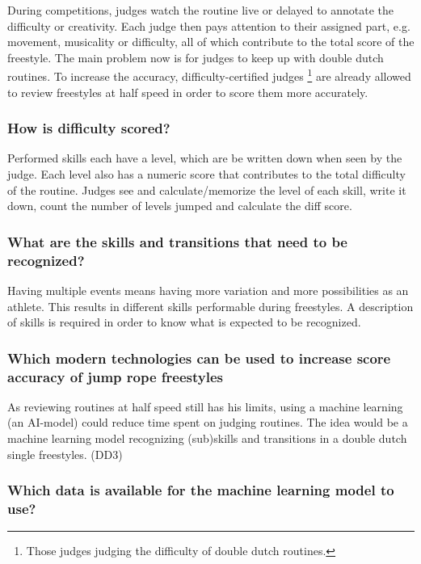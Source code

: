 During competitions, judges watch the routine live or delayed to annotate the difficulty or creativity. Each judge then pays attention to their assigned part, e.g. movement, musicality or difficulty, all of which contribute to the total score of the freestyle. The main problem now is for judges to keep up with double dutch routines. To increase the accuracy, difficulty-certified judges \footnote{Those judges judging the difficulty of double dutch routines.} are already allowed to review freestyles at half speed in order to score them more accurately.

\subsubsection{How is difficulty scored?}
\label{intro-bp:question-difficulty-scored}

Performed skills each have a level, which are be written down when seen by the judge. Each level also has a numeric score that contributes to the total difficulty of the routine. Judges see and calculate/memorize the level of each skill, write it down, count the number of levels jumped and calculate the diff score.

\subsubsection{What are the skills and transitions that need to be recognized?}
\label{intro-bp:question-what-are-the-skills-to-be-recognized}

Having multiple events means having more variation and more possibilities as an athlete. This results in different skills performable during freestyles. A description of skills is required in order to know what is expected to be recognized.

\subsubsection{Which modern technologies can be used to increase score accuracy of jump rope freestyles}
\label{intro-bp:question-which-modern-technologies}

As reviewing routines at half speed still has his limits, using a machine learning (an AI-model) could reduce time spent on judging routines. The idea would be a machine learning model recognizing (sub)skills and transitions in a double dutch single freestyles. (DD3)

\subsubsection{Which data is available for the machine learning model to use?}
\label{intro-bp:question-data}

